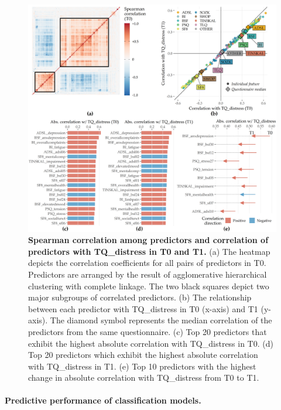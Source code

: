 \documentclass[
  oneside]{book}
\begin{document}
\begin{figure}[htb]

{\centering \includegraphics[width=1\linewidth]{figures/08-cor} 

}

\caption{\textbf{Spearman correlation among predictors and correlation of predictors with TQ\_distress in T0 and T1.} (a) The heatmap depicts the correlation coefficients for all pairs of predictors in T0. Predictors are arranged by the result of agglomerative hierarchical clustering with complete linkage. The two black squares depict two major subgroups of correlated predictors. (b) The relationship between each predictor with TQ\_distress in T0 (x-axis) and T1 (y-axis). The diamond symbol represents the median correlation of the predictors from the same questionnaire. (c) Top 20 predictors that exhibit the highest absolute correlation with TQ\_distress in T0. (d) Top 20 predictors which exhibit the highest absolute correlation with TQ\_distress in T1. (e) Top 10 predictors with the highest change in absolute correlation with TQ\_distress from T0 to T1.}\label{fig:08-cor}
\end{figure}

\paragraph*{Predictive performance of classification models.}
\end{document}
